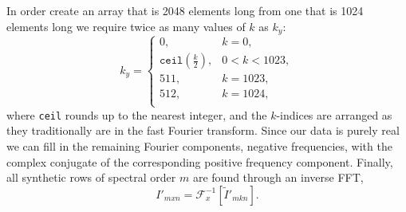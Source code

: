 		In order create an array that is 2048 elements long from one that is 1024 elements long we require twice as many values of $k$ as $k_y$:
		\begin{equation}\label{eq:freq_interp}
		    k_y = \begin{cases}
		        0,       & k=0,\\
		        \texttt{ceil}\left( \frac{k}{2} \right), & 0<k<1023,\\
		        511,        & k = 1023,\\
		        512,      & k = 1024,\\
		    \end{cases}
		\end{equation}
		where \texttt{ceil} rounds up to the nearest integer, and the $k$-indices are arranged as they traditionally are in the fast Fourier transform.
		Since our data is purely real we can fill in the remaining Fourier components,  negative frequencies, with the complex conjugate of the corresponding positive frequency component. 
		Finally, all synthetic rows  of spectral order $m$ are found through an inverse FFT, 		
		\begin{equation}
			I'_{mxn} = \mathcal{F}_x^{-1}\left[\widetilde{I}'_{mkn}\right].
		\end{equation}
        
